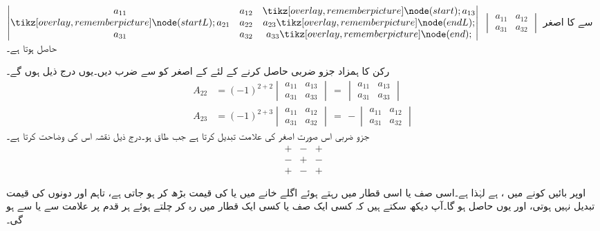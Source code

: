 
\(\begin{vmatrix}
a_{11}& a_{12}&\tikzmark{start}a_{13}\\
\tikzmark{startL}a_{21}& a_{22}&a_{23}\tikzmark{endL}\\
a_{31}& a_{32}&a_{33}\tikzmark{end}
\end{vmatrix}\)\quad
سے     کا  اصغر    \quad
\(\begin{vmatrix}
a_{11}&a_{12}\\
a_{31}&a_{32}
\end{vmatrix}\)\quad
حاصل ہوتا ہے۔

 رکن  کا ہمزاد جزو  ضربی    حاصل کرنے کے لئے  کے اصغر کو  سے ضرب دیں۔یوں درج ذیل ہوں گے۔
\begin{align*}
A_{22}&=(-1)^{2+2} 
\begin{vmatrix}
a_{11}&a_{13}\\
a_{31}&a_{33}
\end{vmatrix}\,=\,
\begin{vmatrix}
a_{11}&a_{13}\\
a_{31}&a_{33}
\end{vmatrix}\\
A_{23}&=(-1)^{2+3} 
\begin{vmatrix}
a_{11}&a_{12}\\
a_{31}&a_{32}
\end{vmatrix}\,=\,
-\begin{vmatrix}
a_{11}&a_{12}\\
a_{31}&a_{32}
\end{vmatrix}
\end{align*}
جزو ضربی     اس صورت اصغر کی علامت تبدیل کرتا ہے جب   طاق ہو۔درج ذیل  نقشہ اس کی وضاحت کرتا  ہے۔
\[\begin{matrix}
+&-&+\\
-&+&-\\
+&-&+
\end{matrix}\]

اوپر بائیں کونے میں ،  ہے لہٰذا   ہے۔اسی صف یا اسی  قطار میں رہتے ہوئے اگلے خانے میں   یا  کی قیمت بڑھ کر   ہو جاتی ہے، تاہم  اور  دونوں کی قیمت تبدیل نہیں ہوتی، اور یوں  حاصل ہو گا۔آپ دیکھ سکتے ہیں کہ  کسی ایک صف یا کسی  ایک قطار میں رہ کر  چلتے ہوئے ہر قدم پر   علامت   سے  یا  سے   ہو گی۔


